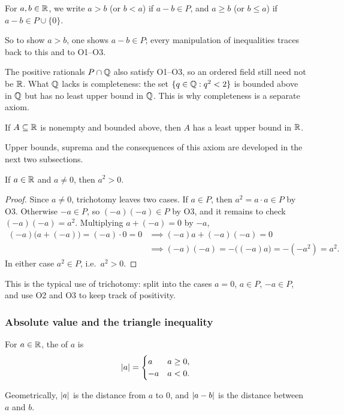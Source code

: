 \begin{defi}
  For $a, b \in \mathbb{R}$, we write $a > b$ (or $b < a$) if $a - b \in P$, and
  $a \geq b$ (or $b \leq a$) if $a - b \in P \cup \{0\}$.
\end{defi}
So to show $a > b$, one shows $a - b \in P$; every manipulation of
inequalities traces back to this and to O1--O3.

The positive rationals $P \cap \mathbb{Q}$ also satisfy O1--O3, so an ordered field
still need not be $\mathbb{R}$. What $\mathbb{Q}$ lacks is completeness: the set
$\{q \in \mathbb{Q} : q^2 < 2\}$ is bounded above in $\mathbb{Q}$ but has no least upper
bound in $\mathbb{Q}$. This is why completeness is a separate axiom.

\begin{axiom}
  If $A \subseteq \mathbb{R}$ is nonempty and bounded above, then $A$ has a least
  upper bound in $\mathbb{R}$.
\end{axiom}
Upper bounds, suprema and the consequences of this axiom are developed in
the next two subsections.

\begin{eg}
  If $a \in \mathbb{R}$ and $a \neq 0$, then $a^2 > 0$.
\end{eg}

\begin{proof}
  Since $a \neq 0$, trichotomy leaves two cases. If $a \in P$, then
  $a^2 = a \cdot a \in P$ by O3. Otherwise $-a \in P$, so
  $(-a)(-a) \in P$ by O3, and it remains to check $(-a)(-a) = a^2$.
  Multiplying $a + (-a) = 0$ by $-a$,
  \begin{align*}
    (-a)\bigl(a + (-a)\bigr) = (-a) \cdot 0 = 0
    &\implies (-a)a + (-a)(-a) = 0\\
    &\implies (-a)(-a) = -\bigl((-a)a\bigr) = -(-a^2) = a^2.
  \end{align*}
  In either case $a^2 \in P$, i.e.\ $a^2 > 0$.
\end{proof}
This is the typical use of trichotomy: split into the cases $a = 0$,
$a \in P$, $-a \in P$, and use O2 and O3 to keep track of positivity.

\subsubsection*{Absolute value and the triangle inequality}
\begin{defi}
  For $a \in \mathbb{R}$, the  of $a$ is
  \[
    \left\lvert a\right\rvert =
    \begin{cases}
      a & a \geq 0,\\
      -a & a < 0.
    \end{cases}
  \]
\end{defi}
Geometrically, $\left\lvert a\right\rvert$ is the distance from $a$ to $0$, and $\left\lvert a - b\right\rvert$
is the distance between $a$ and $b$.

